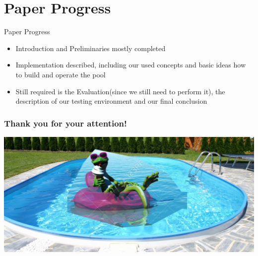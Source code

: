 \documentclass{beamer}
\begin{document}
\section{Paper Progress}
\begin{frame}
	\begin{center}
	\huge Paper Progress \normalsize	
	\end{center}
\end{frame}

\begin{frame}
	\begin{itemize}
		\item Introduction and Preliminaries mostly completed
		\item Implementation described, including our used concepts and basic ideas how to build and operate the pool
		\item Still required is the Evaluation(since we still need to perform it), the description of our testing environment and our final conclusion
	\end{itemize}
\end{frame}

\begin{frame}
    \frametitle{Thank you for your attention!}
 	\includegraphics[width=\textwidth]{img/important.jpg}
\end{frame}
\end{document}
